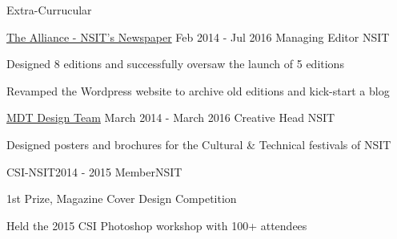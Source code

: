 \documentclass{resume} %
\begin{document}

        



\begin{rSection}{Extra-Currucular} \itemsep -3pt

    \begin{rSubsection}
        {\href{http://alliancensit.com/our-editions/}{The Alliance - NSIT's Newspaper}}
            {Feb 2014 - Jul 2016}
        {Managing Editor}
            {NSIT}
        
        \item Designed 8 editions and successfully oversaw the launch of 5 editions
        \item Revamped the Wordpress website to archive old editions and kick-start a blog
    \end{rSubsection}


    \begin{rSubsection}
        {\href{https://www.facebook.com/mokshansit}{MDT Design Team}}
            {March 2014 - March 2016}
        {Creative Head}
            {NSIT}
        \item Designed posters and brochures for the Cultural \& Technical festivals of NSIT
    \end{rSubsection}

    \begin{rSubsection}{CSI-NSIT}{2014 - 2015}
        {Member}{NSIT}
        \item 1st Prize, Magazine Cover Design Competition
        \item Held the 2015 CSI Photoshop workshop with 100+ attendees
    \end{rSubsection}

\end{rSection}
\end{document}
